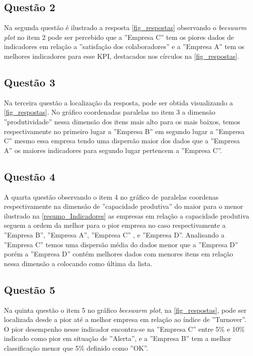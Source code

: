 \documentclass[
	12pt,				%
	openright,			%
	oneside,			%
	a4paper,			%
	english,			%
	brazil				%
	]{abntex2}
\begin{document}
\subsection{Questão 2}
Na segunda questão é ilustrado a resposta \autoref{fig_respostas} observando o \textit{beeswarm plot} no item 2 pode ser percebido que a ''Empresa C'' tem os piores dados de indicadores em relação a ''satisfação dos colaboradores'' e a ''Empresa A'' tem os melhores indicadores para esse KPI, destacados nos círculos na \autoref{fig_respostas}.

\subsection{Questão 3} 
Na terceira questão a localização da resposta, pode ser obtida visualizando a \autoref{fig_respostas}. No gráfico coordenadas paralelas no item 3 a dimensão ''produtividade'' nessa dimensão dos itens mais alto para os mais baixos, temos respectivamente no primeiro lugar a ''Empresa B'' em segundo lugar a ''Empresa C'' mesmo essa empresa tendo uma dispersão maior dos dados que a ''Empresa A'' os maiores indicadores para segundo lugar pertencem a ''Empresa C''.

\subsection{Questão 4}
A quarta questão observando o item 4 no gráfico de paralelas coordenas respectivamente na dimensão de ''capacidade produtiva'' do maior para o menor ilustrado na \autoref{resumo_Indicadores} as empresas em relação a capacidade produtiva seguem a ordem da melhor para o pior empresa no caso respectivamente a ''Empresa B'', ''Empresa A'', ''Empresa C'' , e ''Empresa D''. Analisando a ''Empresa C'' temos uma dispersão média do dados menor que a ''Empresa D'' porém a ''Empresa D'' contém melhores dados com menores itens em relação nessa dimensão a colocando como última da lista. 

\subsection{Questão 5}
Na quinta questão o item 5 no gráfico \textit{beeswarm plot}, na \autoref{fig_respostas}, pode ser localizada desde a pior até a melhor empresa em relação ao  índice de ''Turnover''. O pior desempenho nesse indicador encontra-se na ''Empresa C'' entre 5\% e 10\% indicado como pior em situação de ''Alerta'', e a ''Empresa B'' tem a melhor classificação menor que 5\% definido como ''OK''.
\end{document}

